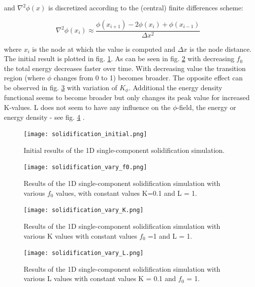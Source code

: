 and \(\nabla^{2} \phi(x) \) is discretized according to the (central) finite differences scheme:

\begin{equation}
	\nabla^{2} \phi(x_{i}) \approx \frac{\phi(x_{i+1}) - 2\phi(x_{i}) + \phi(x_{i-1}) }{\Delta x^{2}} \label{eq:central_euler_second_derivative}
\end{equation}

where \(x_{i}\) is the node at which the value is computed and \(\Delta x\) is the node distance. The initial result is plotted in fig. \ref{fig:solidification_init}. As can be seen in fig. \ref{fig:solidification_f0} with decreasing \(f_{0}\) the total energy decreases faster over time. With decreasing value the transition region (where \(\phi\) changes from 0 to 1) becomes broader. The opposite effect can be observed in fig. \ref{fig:solidification_K} with variation of \(K_{\phi}\). Additional the energy density functional seems to become broader but only changes its peak value for increased K-values. L does not seem to have any influence on the \(\phi\)-field, the energy or energy density - see fig. \ref{fig:solidification_L} .


\begin{figure}[htb]
	\centering
	\texttt{[image: solidification\_initial.png]}
	\caption{Initial results of the 1D single-component solidification simulation.}
	\label{fig:solidification_init}
\end{figure}

\begin{figure}[htb]
	\centering
	\texttt{[image: solidification\_vary\_f0.png]}
	\caption{Results of the 1D single-component solidification simulation with various \(f_{0}\) values, with constant values K=0.1 and L = 1.}
	\label{fig:solidification_f0}
\end{figure}

\begin{figure}[htb]
	\centering
	\texttt{[image: solidification\_vary\_K.png]}
	\caption{Results of the 1D single-component solidification simulation with various K values with constant values \(f_0 \) =1 and L = 1.}
	\label{fig:solidification_K}
\end{figure}


\begin{figure}[htb]
	\centering
	\texttt{[image: solidification\_vary\_L.png]}
	\caption{Results of the 1D single-component solidification simulation with various L values with constant values K = 0.1 and \(f_0\) = 1.}
	\label{fig:solidification_L}
\end{figure}

